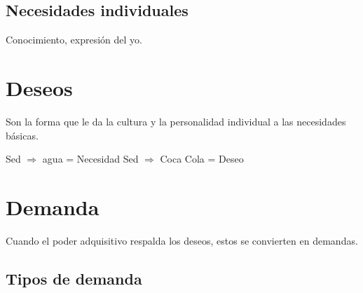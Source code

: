 \documentclass[10pt, spanish, a5paper]{article}
\begin{document}
\subsection{Necesidades individuales}
Conocimiento, expresión del yo.

\section{Deseos}
Son la forma que le da la cultura y la personalidad individual a las necesidades básicas.

Sed $\Rightarrow$ agua = Necesidad
Sed $\Rightarrow$ Coca Cola = Deseo

\section{Demanda}

Cuando el poder adquisitivo respalda los deseos, estos se convierten en demandas.

\subsection{Tipos de demanda}
\end{document}
